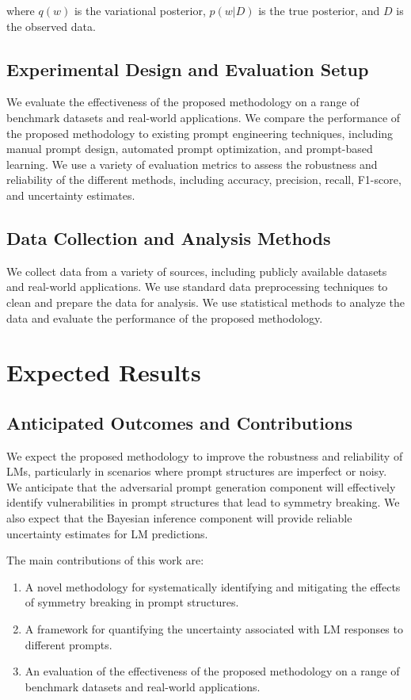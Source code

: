 \documentclass{article}
\begin{document}
where $q(w)$ is the variational posterior, $p(w|D)$ is the true posterior, and $D$ is the observed data.

\subsection{Experimental Design and Evaluation Setup}
We evaluate the effectiveness of the proposed methodology on a range of benchmark datasets and real-world applications. We compare the performance of the proposed methodology to existing prompt engineering techniques, including manual prompt design, automated prompt optimization, and prompt-based learning. We use a variety of evaluation metrics to assess the robustness and reliability of the different methods, including accuracy, precision, recall, F1-score, and uncertainty estimates.

\subsection{Data Collection and Analysis Methods}
We collect data from a variety of sources, including publicly available datasets and real-world applications. We use standard data preprocessing techniques to clean and prepare the data for analysis. We use statistical methods to analyze the data and evaluate the performance of the proposed methodology.

\section{Expected Results}

\subsection{Anticipated Outcomes and Contributions}
We expect the proposed methodology to improve the robustness and reliability of LMs, particularly in scenarios where prompt structures are imperfect or noisy. We anticipate that the adversarial prompt generation component will effectively identify vulnerabilities in prompt structures that lead to symmetry breaking. We also expect that the Bayesian inference component will provide reliable uncertainty estimates for LM predictions.

The main contributions of this work are:

\begin{enumerate}
    \item A novel methodology for systematically identifying and mitigating the effects of symmetry breaking in prompt structures.
    \item A framework for quantifying the uncertainty associated with LM responses to different prompts.
    \item An evaluation of the effectiveness of the proposed methodology on a range of benchmark datasets and real-world applications.
\end{enumerate}
\end{document}
